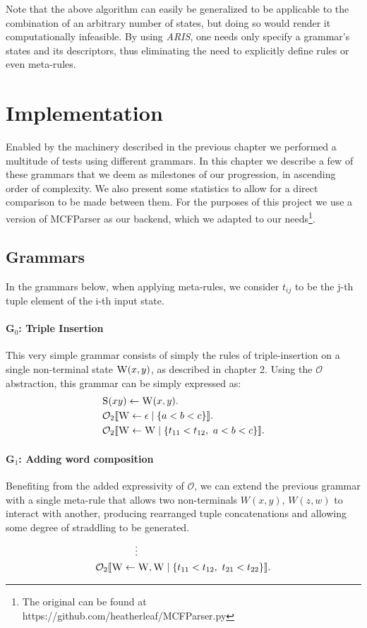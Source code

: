 \documentclass[nonatbib,numbers,10pt]{sigplanconf}
\newcommand\s{\textsc}
\newcommand{\Orderr}[5]{
	\mathcal{#1}_{#5}\llbracket #2 \leftarrow #3 \mid \{ #4 \} \rrbracket.
}
\newcommand{\Or}[4]{\Orderr{O}{#1}{#2}{#3}{#4}}
\begin{document}
Note that the above algorithm can easily be generalized to be applicable to the combination of an arbitrary number of states, but doing so would render it computationally infeasible. By using \textit{ARIS}, one needs only specify a grammar's states and its descriptors, thus eliminating the need to explicitly define rules or even meta-rules.

\section{Implementation}\label{sec3}
Enabled by the machinery described in the previous chapter we performed a multitude of tests using different grammars. In this chapter we describe a few of these grammars that we deem as milestones of our progression, in ascending order of complexity. We also present some statistics to allow for a direct comparison to be made between them. For the purposes of this project we use a version of MCFParser\cite{ljunglof} as our backend, which we adapted to our needs\footnote{The original can be found at https://github.com/heatherleaf/MCFParser.py}.
\subsection{Grammars}
In the grammars below, when applying meta-rules, we consider $t_{ij}$ to be the j-th tuple element of the i-th input state.
\paragraph{G$_0$: Triple Insertion}
This very simple grammar consists of simply the rules of triple-insertion on a single non-terminal state $\s{W}(x,y)$, as described in chapter 2. Using the $\mathcal{O}$ abstraction, this grammar can be simply expressed as:
\begin{align*}
&\s{S}(xy) \leftarrow \s{W}(x,y). \\
&\Or{\s{W}}{\epsilon}{a < b < c}{2} \\
&\Or{\s{W}}{\s{W}}{t_{11} < t_{12},\ a < b < c}{2}
\end{align*}
\paragraph{G$_1$: Adding word composition}
Benefiting from the added expressivity of $\mathcal{O}$, we can extend the previous grammar with a single meta-rule that allows two non-terminals $W(x,y)$, $W(z,w)$ to interact with another, producing rearranged tuple concatenations and allowing some degree of straddling to be generated.
\vspace{-\topsep}
\begin{align*}
& \quad\quad\quad\quad \vdots \\
&\Or{\s{W}}{\s{W}, \s{W}}{t_{11} < t_{12},\ t_{21} < t_{22}}{2}
\end{align*}
\end{document}
